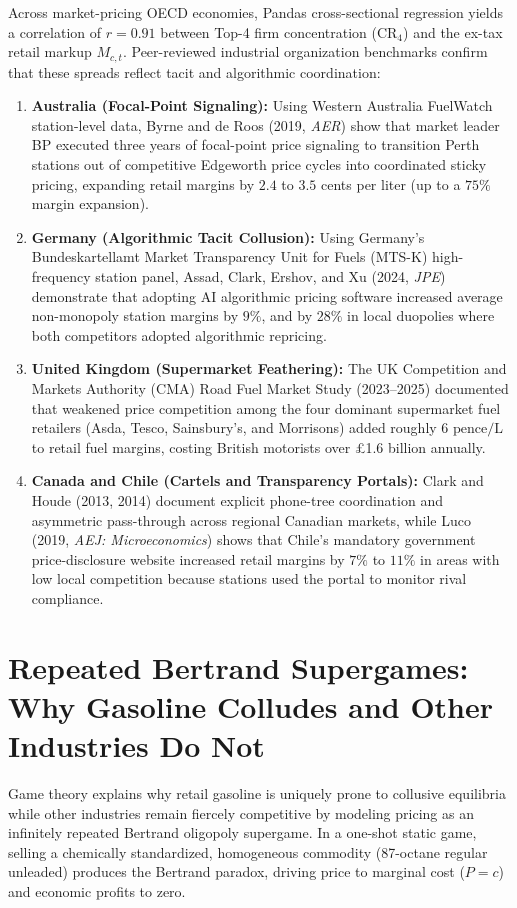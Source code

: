\documentclass[11pt]{article}
\begin{document}
Across market-pricing OECD economies, Pandas cross-sectional regression yields a correlation of $r = 0.91$ between Top-4 firm concentration ($\text{CR}_4$) and the ex-tax retail markup $M_{c,t}$. Peer-reviewed industrial organization benchmarks confirm that these spreads reflect tacit and algorithmic coordination:
\begin{enumerate}[label=\arabic*.]
\item \textbf{Australia (Focal-Point Signaling):} Using Western Australia FuelWatch station-level data, Byrne and de Roos (2019, \textit{AER}) show that market leader BP executed three years of focal-point price signaling to transition Perth stations out of competitive Edgeworth price cycles into coordinated sticky pricing, expanding retail margins by $2.4$ to $3.5$ cents per liter (up to a $75\%$ margin expansion).
\item \textbf{Germany (Algorithmic Tacit Collusion):} Using Germany's Bundeskartellamt Market Transparency Unit for Fuels (MTS-K) high-frequency station panel, Assad, Clark, Ershov, and Xu (2024, \textit{JPE}) demonstrate that adopting AI algorithmic pricing software increased average non-monopoly station margins by $9\%$, and by $28\%$ in local duopolies where both competitors adopted algorithmic repricing.
\item \textbf{United Kingdom (Supermarket Feathering):} The UK Competition and Markets Authority (CMA) Road Fuel Market Study (2023--2025) documented that weakened price competition among the four dominant supermarket fuel retailers (Asda, Tesco, Sainsbury's, and Morrisons) added roughly $6\text{ pence/L}$ to retail fuel margins, costing British motorists over \pounds 1.6 billion annually.
\item \textbf{Canada and Chile (Cartels and Transparency Portals):} Clark and Houde (2013, 2014) document explicit phone-tree coordination and asymmetric pass-through across regional Canadian markets, while Luco (2019, \textit{AEJ: Microeconomics}) shows that Chile's mandatory government price-disclosure website increased retail margins by $7\%$ to $11\%$ in areas with low local competition because stations used the portal to monitor rival compliance.
\end{enumerate}

\section{Repeated Bertrand Supergames: Why Gasoline Colludes and Other Industries Do Not}
\label{sec:supergame-theory}
Game theory explains why retail gasoline is uniquely prone to collusive equilibria while other industries remain fiercely competitive by modeling pricing as an infinitely repeated Bertrand oligopoly supergame. In a one-shot static game, selling a chemically standardized, homogeneous commodity (87-octane regular unleaded) produces the Bertrand paradox, driving price to marginal cost ($P = c$) and economic profits to zero.
\end{document}
